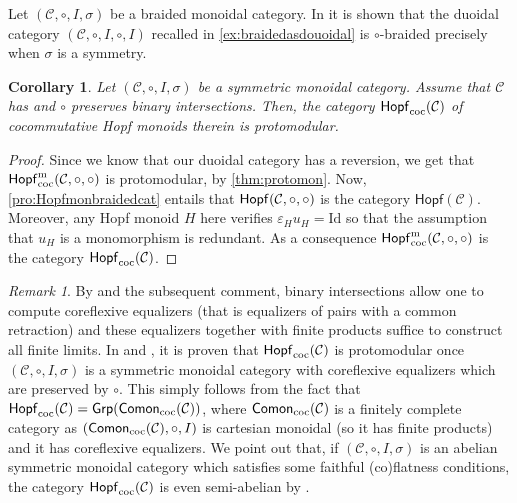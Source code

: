 \documentclass[nosumlimits,twoside]{amsart}
\newtheorem{corollary}[corollary]{\sc Corollary}
\theoremstyle{definition}
\theoremstyle{remark}
\newtheorem{remark}[remark]{\sc Remark}
\newcommand{\rd}[1]{{\color{red}{#1}}}
\newcommand{\as}[1]{{\color{blue}{#1}}}
\newcommand{\id}{\mathrm{Id}}
\newcommand{\Cc}{\mathcal{C}}
\def\Hopfmon{{\sf Hopf}}
\def\cHopfmon{{\sf Hopf}_{\mathrm{coc}}}
\def\cComon{{\sf Comon}_{\mathrm{coc}}}
\begin{document}
Let $(\Cc,\circ,I,\sigma)$ be a braided monoidal category. In \cite[Proposition 6.13]{Aguiar} it is shown that the duoidal category  $(\Cc,\circ,I,\circ,I)$ recalled in \cref{ex:braidedasdouoidal} is $\circ$-braided precisely when $\sigma$ is a symmetry.

\begin{corollary}%
Let $(\Cc,\circ,I,\sigma)$ be a symmetric monoidal category. Assume that $\mathcal{C}$ has and $\circ$ preserves binary intersections. Then, the category $\cHopfmon(\Cc)$ of cocommutative Hopf monoids therein is protomodular.
\end{corollary}

\begin{proof}
Since we know that our duoidal category has a reversion, we get that $\cHopfmon^{\mathrm{m}}(\Cc,\circ, \circ )$ is protomodular, by \cref{thm:protomon}. Now, \cref{pro:Hopfmonbraidedcat} entails that $\Hopfmon(\Cc,\circ,\circ)$ is the category $\mathsf{Hopf}(\Cc)$. Moreover, any Hopf monoid $H$ here verifies $\varepsilon_Hu_H=\id$ so that the assumption that $u_H$ is a monomorphism is redundant. As a consequence $\cHopfmon^{\mathrm{m}}(\Cc,\circ, \circ )$ is the category $\cHopfmon(\Cc)$.  \end{proof}

\begin{remark}%
\label{rmk:Hopfcc}
    By \cite[Lemma 1.2.10]{Johnstone-v1} and the subsequent comment, binary intersections allow one to compute coreflexive equalizers (that is equalizers of pairs with a common retraction) and  these equalizers together with finite products suffice to construct all finite limits. In \cite[Proposition 3.11]{SZ} and \cite[Remark 3.4]{SZ}, it is proven that $\cHopfmon(\Cc)$ is protomodular once $(\Cc,\circ,I,\sigma)$ is a symmetric monoidal category with coreflexive equalizers which are preserved by $\circ$. This simply follows from the fact that $\cHopfmon(\Cc)=\mathsf{Grp}(\cComon(\Cc))$, where $\cComon(\Cc)$ is a finitely complete category as $(\cComon(\Cc),\circ,I)$ is cartesian monoidal (so it has finite products) and it has coreflexive equalizers. We point out that, if $(\Cc,\circ,I,\sigma)$ is an abelian symmetric monoidal category which satisfies some faithful (co)flatness conditions, the category $\cHopfmon(\Cc)$ is even semi-abelian by \cite[Theorem 8.3]{SZ}.
\end{remark}
\end{document}
